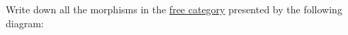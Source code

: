 Write down all the morphisms in the \href{doc/1 math/Seven Sketches in Compositionality/Chapter 3: Databases/2 Categories/1 Free Categories/2 Free category on a graph}{free category} presented by the following diagram:


